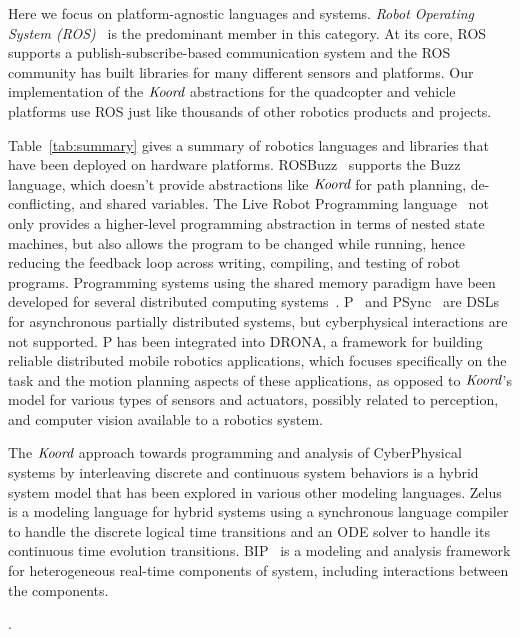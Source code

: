 Here we focus on platform-agnostic languages and systems. {\em Robot Operating System (ROS)\/}~\cite{ros} is the predominant member in this category. At its core, ROS supports a publish-subscribe-based communication system and the ROS community has built libraries for  many  different sensors and platforms.
Our implementation of the $\emph{Koord}$ abstractions for the quadcopter and vehicle platforms use ROS just like thousands of other robotics products and  projects.
 
 Table~\ref{tab:summary} gives a summary of robotics languages and libraries that have been deployed on hardware platforms.
 ROSBuzz~\cite{ROSBuzz} supports the Buzz language, which doesn't provide abstractions like $\emph{Koord}$ for path planning, de-conflicting, and shared variables. The Live Robot Programming language~\cite{campusanofabry:lrp2016} not only provides a higher-level programming abstraction in terms of nested state machines, but also allows the program to be changed while running, hence reducing the feedback loop across writing, compiling, and testing of robot programs. Programming systems using the shared memory paradigm have been developed for several distributed computing systems~\cite{dsm1991,Adve96sharedmemory,Azure,Cassandra,Dynamo}. P~\cite{Planguage}  and PSync~\cite{PSyncLanguage} are DSLs for asynchronous partially distributed systems, but cyberphysical interactions are not supported. P has been integrated into DRONA, a framework for building reliable distributed mobile robotics applications, which focuses specifically on the task and the motion planning aspects of these applications, as opposed to $\emph{Koord}$'s model for various types of sensors and actuators, possibly related to perception, and computer vision available to a robotics system.


The $\emph{Koord}$ approach towards programming and analysis of CyberPhysical systems by interleaving discrete and continuous system behaviors is a hybrid system model that has been explored in various other modeling languages. Zelus~\cite{zelus} is a modeling language for hybrid systems using a synchronous language compiler to handle the discrete logical time transitions and an ODE solver to handle its continuous time evolution transitions. BIP~\cite{bip} is a modeling and analysis framework for heterogeneous real-time components of system, including interactions between the components.
%

.

